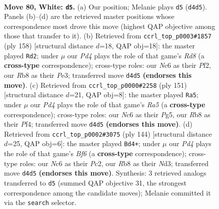 \documentclass[11pt]{article}
\begin{document}
\clearpage

\begin{figure}[p]\centering
\begin{subfigure}{0.46\textwidth}\centering
\resizebox{\linewidth}{!}{%
\newchessgame
\chessboard[
  setfen={1R6/5kp1/r1N2p2/7p/3P3P/6P1/5K2/8 w - - 53 80},
  showmover=false,
  pgfstyle=straightmove, color=movearrow, markmove={d4-d5}
]}
\caption{}
\end{subfigure}\hfill
\begin{subfigure}{0.46\textwidth}\centering
\resizebox{\linewidth}{!}{%
\newchessgame
\chessboard[
  setfen={3R4/5pk1/7p/6p1/6P1/4P2P/5P1K/5r2 w - - 70 80},
  showmover=false,
  pgfstyle=straightmove, color=movearrow, markmove={d8-d2}
]}
\caption{}
\end{subfigure}
\\[4pt]
\begin{subfigure}{0.46\textwidth}\centering
\resizebox{\linewidth}{!}{%
\newchessgame
\chessboard[
  setfen={6R1/4k3/4p3/6p1/r4pP1/5P2/4PK2/8 b - - 53 76},
  showmover=false,
  pgfstyle=straightmove, color=movearrow, markmove={a4-a5}
]}
\caption{}
\end{subfigure}\hfill
\begin{subfigure}{0.46\textwidth}\centering
\resizebox{\linewidth}{!}{%
\newchessgame
\chessboard[
  setfen={2r5/8/1k3B2/1p1K4/p7/P2N4/1PP5/8 w - - 25 73},
  showmover=false,
  pgfstyle=straightmove, color=movearrow, markmove={f6-d4}
]}
\caption{}
\end{subfigure}
\caption{\textbf{Move 80, White: \texttt{d5}.} (a) Our position; Melanie plays \texttt{d5} (\texttt{d4d5}). Panels (b)--(d) are the retrieved master positions whose correspondence most drove this move (highest QAP objective among those that transfer to it). (b) Retrieved from \texttt{ccrl\_top\_p0003\#1857} (ply 158) [structural distance $d$=18, QAP obj=18]: the master played \texttt{Rd2}; under $\mu$ our \emph{Pd4} plays the role of that game's \emph{Rd8} (a \textbf{cross-type} correspondence); cross-type roles: our \emph{N}c6 as their \emph{P}f2, our \emph{R}b8 as their \emph{P}e3; transferred move \texttt{d4d5} \textbf{(endorses this move)}. (c) Retrieved from \texttt{ccrl\_top\_p0000\#2258} (ply 151) [structural distance $d$=21, QAP obj=8]: the master played \texttt{Ra5}; under $\mu$ our \emph{Pd4} plays the role of that game's \emph{Ra5} (a \textbf{cross-type} correspondence); cross-type roles: our \emph{N}c6 as their \emph{P}g5, our \emph{R}b8 as their \emph{P}f4; transferred move \texttt{d4d5} \textbf{(endorses this move)}. (d) Retrieved from \texttt{ccrl\_top\_p0002\#3075} (ply 144) [structural distance $d$=25, QAP obj=6]: the master played \texttt{Bd4+}; under $\mu$ our \emph{Pd4} plays the role of that game's \emph{Bf6} (a \textbf{cross-type} correspondence); cross-type roles: our \emph{N}c6 as their \emph{P}c2, our \emph{R}b8 as their \emph{N}d3; transferred move \texttt{d4d5} \textbf{(endorses this move)}. Synthesis: 3 retrieved analogs transferred to \texttt{d5} (summed QAP objective 31, the strongest correspondence among the candidate moves); Melanie committed it via the \texttt{search} selector.}
\label{fig:thought-m158}
\end{figure}
\end{document}
